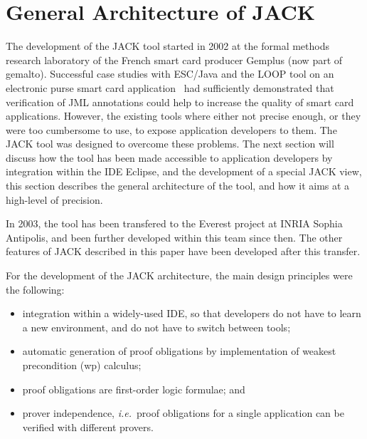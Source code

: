 \section{General Architecture of JACK}\label{SecArchitecture}

The development of the JACK tool started in 2002 at the formal methods
research laboratory of the French smart card producer Gemplus (now
part of gemalto). Successful case studies with ESC/Java and the LOOP
tool on an electronic purse smart card
application~\cite{BreunesseCHJ03} had sufficiently demonstrated that
verification of JML annotations could help to increase the quality of
smart card applications. However, the existing tools where either not
precise enough, or they were too cumbersome to use, to expose
application developers to them. The JACK tool was designed to overcome
these problems. The next section will discuss how the tool has been
made accessible to application developers by integration within the
IDE Eclipse, and the development of a special JACK view, this
section describes the general architecture of the tool, and how it
aims at a high-level of precision.

In 2003, the tool has been transfered to the Everest project at INRIA
Sophia Antipolis, and been further developed within this team since
then. The other features of JACK described in this paper have been
developed after this transfer.

For the development of the JACK architecture, the main design
principles were the following:
\begin{itemize}
\item integration within a widely-used IDE, so that developers do not
have to learn a new environment, and do not have to switch between tools;
\item automatic generation of proof obligations by
implementation of weakest precondition (wp) calculus;
\item proof obligations are first-order logic formulae; and
\item prover independence, \emph{i.e.}\ proof obligations for
a single application can be verified with different provers.
\end{itemize}

